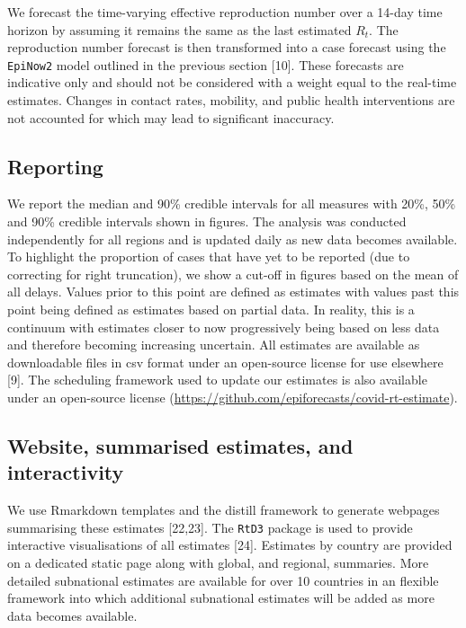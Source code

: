 \documentclass[
]{article}
\begin{document}
We forecast the time-varying effective reproduction number over a 14-day
time horizon by assuming it remains the same as the last estimated
\(R_t\). The reproduction number forecast is then transformed into a
case forecast using the \texttt{EpiNow2} model outlined in the previous
section {[}10{]}. These forecasts are indicative only and should not be
considered with a weight equal to the real-time estimates. Changes in
contact rates, mobility, and public health interventions are not
accounted for which may lead to significant inaccuracy.

\hypertarget{reporting}{%
\subsection{Reporting}\label{reporting}}

We report the median and 90\% credible intervals for all measures with
20\%, 50\% and 90\% credible intervals shown in figures. The analysis
was conducted independently for all regions and is updated daily as new
data becomes available. To highlight the proportion of cases that have
yet to be reported (due to correcting for right truncation), we show a
cut-off in figures based on the mean of all delays. Values prior to this
point are defined as estimates with values past this point being defined
as estimates based on partial data. In reality, this is a continuum with
estimates closer to now progressively being based on less data and
therefore becoming increasing uncertain. All estimates are available as
downloadable files in csv format under an open-source license for use
elsewhere {[}9{]}. The scheduling framework used to update our estimates
is also available under an open-source license
(\url{https://github.com/epiforecasts/covid-rt-estimate}).

\hypertarget{website-summarised-estimates-and-interactivity}{%
\subsection{Website, summarised estimates, and
interactivity}\label{website-summarised-estimates-and-interactivity}}

We use Rmarkdown templates and the distill framework to generate
webpages summarising these estimates {[}22,23{]}. The \texttt{RtD3}
package is used to provide interactive visualisations of all estimates
{[}24{]}. Estimates by country are provided on a dedicated static page
along with global, and regional, summaries. More detailed subnational
estimates are available for over 10 countries in an flexible framework
into which additional subnational estimates will be added as more data
becomes available.
\end{document}
